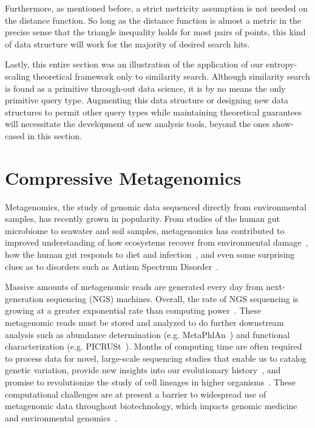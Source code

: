 \documentclass{amsbook}
\theoremstyle{definition}
\theoremstyle{remark}
\numberwithin{equation}{section}
\begin{document}
Furthermore, as mentioned before, a strict metricity assumption is not needed on the distance function.
So long as the distance function is almost a metric in the precise sense that the triangle inequality holds for most pairs of points, this kind of data structure will work for the majority of desired search hits.

Lastly, this entire section was an illustration of the application of our entropy-scaling theoretical framework only to similarity search.
Although similarity search is found as a primitive through-out data science, it is by no means the only primitive query type.
Augmenting this data structure or designing new data structures to permit other query types while maintaining theoretical guarantees will necessitate the development of new analysis tools, beyond the ones show-cased in this section.



\section{Compressive Metagenomics}

Metagenomics, the study of genomic data sequenced directly from environmental
samples, has recently grown in popularity.
From studies of the human gut microbiome to seawater and soil samples,
metagenomics has contributed to improved understanding of how ecosystems recover
from environmental damage~\cite{Tyson:2004}, how the human gut responds to 
diet
and infection~\cite{David:2014}, and even some surprising clues as to disorders 
such as Autism Spectrum Disorder~\cite{MacFabe:2012}.

Massive amounts of metagenomic reads are generated every day from 
next-generation sequencing (NGS) machines.
Overall, the rate of NGS sequencing is growing at a greater exponential rate
than computing power~\cite{Loh}.
These metagenomic reads must be stored and analyzed to do further downstream
analysis such as abundance determination (e.g. MetaPhlAn~\cite{Huttenhower}) 
and functional characterization (e.g. PICRUSt~\cite{Huttenhower}).
 Months of computing time are often required to process data for novel, 
large-scale sequencing studies that enable us to catalog genetic variation, 
provide new insights into our evolutionary history~\cite{8}, and promise to 
revolutionize the study of cell lineages in higher organisms~\cite{9}. 
These computational challenges are at present a barrier to widespread use of 
metagenomic data throughout biotechnology, which impacts genomic medicine and 
environmental genomics~\cite{blah}.
\end{document}
